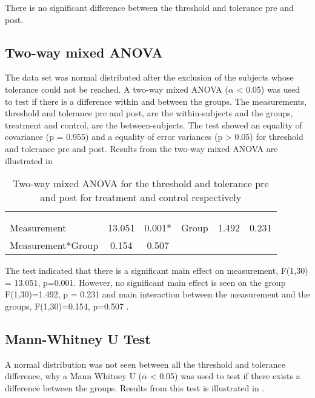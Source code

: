 There is no significant difference between the threshold and tolerance pre and post.

\subsection{Two-way mixed ANOVA}
The data set was normal distributed after the exclusion of the subjects whose tolerance could not be reached.
A two-way mixed ANOVA ($\alpha$ < 0.05) was used to test  if there is a difference within and between the groups.
The measurements, threshold and tolerance pre and post, are the within-subjects and the groups, treatment and control, are the between-subjects. The test showed an equality of covariance (p = 0.955) and a equality of error variances (p > 0.05) for threshold and tolerance pre and post. Results from the two-way mixed ANOVA are illustrated in 

\begin{longtable} {l|c|c|c|c|c}
\caption{Two-way mixed ANOVA for the threshold and tolerance pre and post for treatment and control respectively}
	\label{tab:ANOVA1} \\
\multicolumn{3}{c|}{ \cellcolor[HTML]{C0C0C0}{\textbf{Within-Subjects Effect}}} & \multicolumn{3}{c}{ \cellcolor[HTML]{C0C0C0}{\textbf{Between-Subjects Effect}}}  	\\  \rule{0pt}{3ex} 
  \cellcolor[HTML]{C0C0C0}{} &
 \multicolumn{1}{c|}{ \cellcolor[HTML]{C0C0C0}{F}} & \multicolumn{1}{c|}{ \cellcolor[HTML]{C0C0C0}{Sig}} &  \multicolumn{1}{c|}{ \cellcolor[HTML]{C0C0C0}{}} &  \multicolumn{1}{c|}{ \cellcolor[HTML]{C0C0C0}{F}} & \multicolumn{1}{|c}{ \cellcolor[HTML]{C0C0C0}{Sig}}	\\ \hline 
Measurement & 13.051 & 0.001* & Group & 1.492 & 0.231\\ \hline
Measurement*Group & 0.154 & 0.507 & &  & \\ \hline
\end{longtable}
\vspace{-.5cm}

The test indicated that there is a significant main effect on measurement, F(1,30) = 13.051, p=0.001. However, no significant main effect is seen on the group F(1,30)=1.492, p = 0.231 and main interaction between the measurement and the groups, F(1,30)=0.154, p=0.507 .

\subsection{Mann-Whitney U Test}
A normal distribution was not seen between all the threshold and tolerance difference, why a Mann Whitney U ($\alpha$ < 0.05) was used to test if there exists a difference between the groups. Results from this test is illustrated in .

